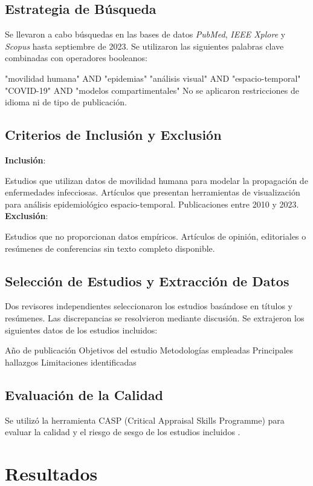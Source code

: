 \documentclass[sigconf]{acmart}
\begin{document}
\subsection{Estrategia de Búsqueda}

Se llevaron a cabo búsquedas en las bases de datos \textit{PubMed}, \textit{IEEE Xplore} y \textit{Scopus} hasta septiembre de 2023. Se utilizaron las siguientes palabras clave combinadas con operadores booleanos:

"movilidad humana" AND "epidemias"
"análisis visual" AND "espacio-temporal"
"COVID-19" AND "modelos compartimentales"
No se aplicaron restricciones de idioma ni de tipo de publicación.

\subsection{Criterios de Inclusión y Exclusión}

\textbf{Inclusión}:

Estudios que utilizan datos de movilidad humana para modelar la propagación de enfermedades infecciosas.
Artículos que presentan herramientas de visualización para análisis epidemiológico espacio-temporal.
Publicaciones entre 2010 y 2023.
\textbf{Exclusión}:

Estudios que no proporcionan datos empíricos.
Artículos de opinión, editoriales o resúmenes de conferencias sin texto completo disponible.
\subsection{Selección de Estudios y Extracción de Datos}

Dos revisores independientes seleccionaron los estudios basándose en títulos y resúmenes. Las discrepancias se resolvieron mediante discusión. Se extrajeron los siguientes datos de los estudios incluidos:

Año de publicación
Objetivos del estudio
Metodologías empleadas
Principales hallazgos
Limitaciones identificadas
\subsection{Evaluación de la Calidad}

Se utilizó la herramienta CASP (Critical Appraisal Skills Programme) para evaluar la calidad y el riesgo de sesgo de los estudios incluidos \cite{casp2018}.

\section{Resultados}
\end{document}
